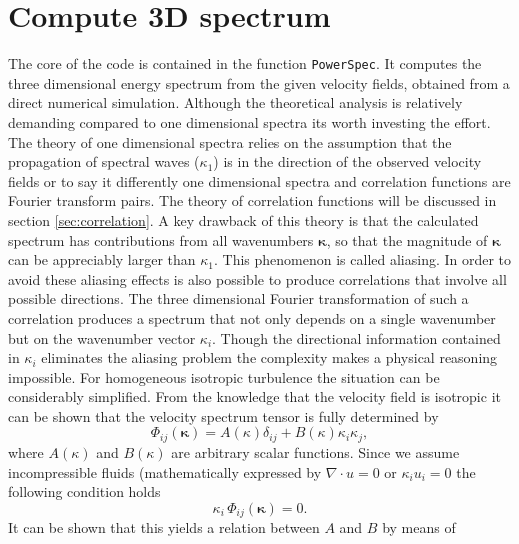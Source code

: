 \documentclass[preprint,12pt,ntfdMod]{elsarticle}
\begin{document}
\section{Compute 3D spectrum}

\begin{par}

The core of the code is contained in the function
\lstinline!PowerSpec!. It computes the three dimensional energy spectrum
from the given velocity fields, obtained from a direct numerical
simulation. Although the theoretical analysis is
relatively demanding compared to one dimensional spectra its worth
investing the effort.
The theory of one dimensional spectra relies
on the assumption that the propagation of spectral waves ($\kappa_1$)
is in the direction of the observed velocity fields or to say it differently one
dimensional spectra and correlation functions are Fourier transform pairs.
The theory of correlation functions will be discussed in section \ref{sec:correlation}.
A key drawback of this theory is that the calculated spectrum has
contributions from all wavenumbers $\boldsymbol\kappa$, so that the
magnitude of $\boldsymbol\kappa$ can be appreciably larger than
$\kappa_1$. This phenomenon is called aliasing.
In order to avoid these aliasing effects is also possible to produce correlations that
involve all possible directions. The three dimensional Fourier
transformation of such a correlation produces a spectrum that not only
depends on a single wavenumber but on the wavenumber vector $\kappa_i$.
Though the directional information contained in $\kappa_i$ eliminates the
aliasing problem the complexity makes a physical reasoning impossible.
For homogeneous isotropic turbulence the situation can be considerably
simplified. From the knowledge that the velocity field is isotropic it can be
shown that the velocity spectrum tensor is fully determined by
  \begin{equation}
      \label{eq:iso_tensor}
      \Phi_{ij}(\boldsymbol\kappa) = A(\kappa)\delta_{ij}+B(\kappa)\kappa_i\kappa_j,
  \end{equation}
where $A(\kappa)$ and $B(\kappa)$ are arbitrary scalar functions. Since we assume
incompressible fluids (mathematically expressed by $\nabla\cdot u=0$ or $\kappa_iu_i=0$
the following condition holds
  \begin{equation}
      \kappa_i\,\Phi_{ij}(\boldsymbol\kappa)=0.
  \end{equation}
It can be shown that this yields a relation between $A$ and $B$ by means of
  \begin{equation}

\end{equation}
\end{par}
\end{document}
